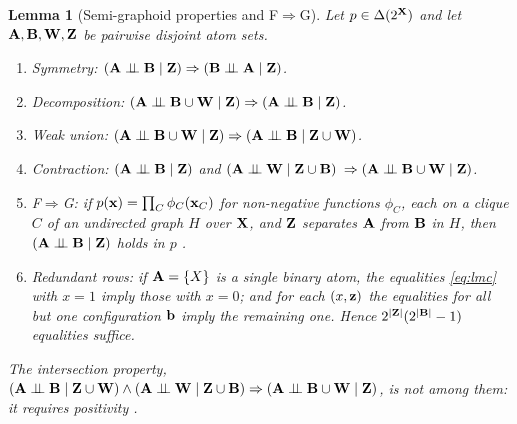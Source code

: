 \documentclass{article} %
\newtheorem{lemma}{Lemma}
\newcommand{\indep}{\perp\!\!\!\perp}
\begin{document}
\begin{lemma}[Semi-graphoid properties and F$\Rightarrow$G]\label{lem:semigraphoid}
Let $p\in\Delta(2^{\mathbf{X}})$ and let $\mathbf{A},\mathbf{B},\mathbf{W},\mathbf{Z}$ be pairwise disjoint atom sets.
\begin{enumerate}
  \item[(i)] \emph{Symmetry:} $(\bA\indep\bB\mid\bZ)\Rightarrow(\bB\indep\bA\mid\bZ)$.
  \item[(ii)] \emph{Decomposition:} $(\bA\indep\bB\cup\bW\mid\bZ)\Rightarrow(\bA\indep\bB\mid\bZ)$.
  \item[(iii)] \emph{Weak union:} $(\bA\indep\bB\cup\bW\mid\bZ)\Rightarrow(\bA\indep\bB\mid\bZ\cup\bW)$.
  \item[(iv)] \emph{Contraction:} $(\bA\indep\bB\mid\bZ)$ and $(\bA\indep\bW\mid\bZ\cup\bB)$ $\Rightarrow(\bA\indep\bB\cup\bW\mid\bZ)$.
  \item[(v)] \emph{F$\Rightarrow$G:} if $p(\mathbf{x})=\prod_{C}\phi_C(\mathbf{x}_C)$ for non-negative functions $\phi_C$, each on a clique $C$ of an undirected graph $H$ over $\mathbf{X}$, and $\mathbf{Z}$ separates $\mathbf{A}$ from $\mathbf{B}$ in $H$, then $(\bA\indep\bB\mid\bZ)$ holds in $p$ \citep[Prop.~3.8]{lauritzen96}.
  \item[(vi)] \emph{Redundant rows:} if $\mathbf{A}=\{X\}$ is a single binary atom, the equalities \eqref{eq:lmc} with $x=1$ imply those with $x=0$; and for each $(x,\mathbf{z})$ the equalities for all but one configuration $\mathbf{b}$ imply the remaining one. Hence $2^{|\mathbf{Z}|}(2^{|\mathbf{B}|}-1)$ equalities suffice.
\end{enumerate}
The intersection property, $(\bA\indep\bB\mid\bZ\cup\bW)\wedge(\bA\indep\bW\mid\bZ\cup\bB)\Rightarrow(\bA\indep\bB\cup\bW\mid\bZ)$, is \emph{not} among them: it requires positivity \citep{cowell99}.
\end{lemma}
\end{document}
